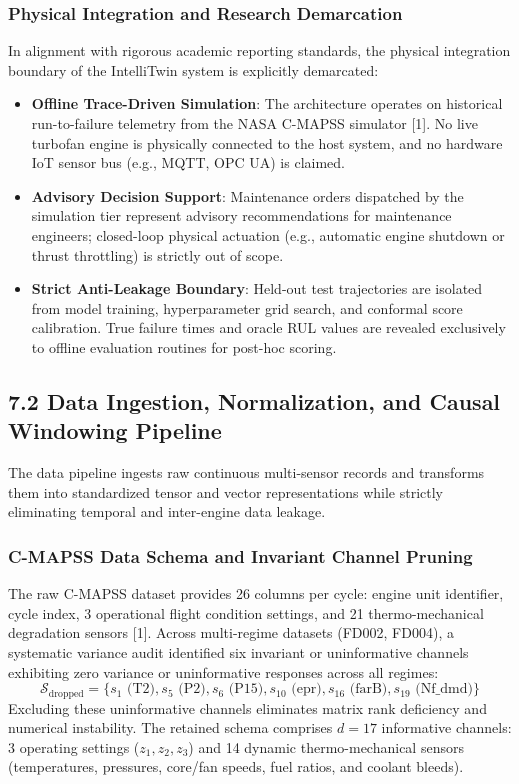 \documentclass[12pt,a4paper]{article}
\begin{document}
\subsubsection*{Physical Integration and Research Demarcation}
In alignment with rigorous academic reporting standards, the physical integration boundary of the IntelliTwin system is explicitly demarcated:
\begin{itemize}
    \item \textbf{Offline Trace-Driven Simulation}: The architecture operates on historical run-to-failure telemetry from the NASA C-MAPSS simulator [1]. No live turbofan engine is physically connected to the host system, and no hardware IoT sensor bus (e.g., MQTT, OPC UA) is claimed.
    \item \textbf{Advisory Decision Support}: Maintenance orders dispatched by the simulation tier represent advisory recommendations for maintenance engineers; closed-loop physical actuation (e.g., automatic engine shutdown or thrust throttling) is strictly out of scope.
    \item \textbf{Strict Anti-Leakage Boundary}: Held-out test trajectories are isolated from model training, hyperparameter grid search, and conformal score calibration. True failure times and oracle RUL values are revealed exclusively to offline evaluation routines for post-hoc scoring.
\end{itemize}

\subsection*{7.2 Data Ingestion, Normalization, and Causal Windowing Pipeline}
The data pipeline ingests raw continuous multi-sensor records and transforms them into standardized tensor and vector representations while strictly eliminating temporal and inter-engine data leakage.

\subsubsection*{C-MAPSS Data Schema and Invariant Channel Pruning}
The raw C-MAPSS dataset provides 26 columns per cycle: engine unit identifier, cycle index, 3 operational flight condition settings, and 21 thermo-mechanical degradation sensors [1]. Across multi-regime datasets (FD002, FD004), a systematic variance audit identified six invariant or uninformative channels exhibiting zero variance or uninformative responses across all regimes:
\begin{equation}
\mathcal{S}_{\text{dropped}} = \{ s_1 \text{ (T2)}, s_5 \text{ (P2)}, s_6 \text{ (P15)}, s_{10} \text{ (epr)}, s_{16} \text{ (farB)}, s_{19} \text{ (Nf\_dmd)} \}
\end{equation}
Excluding these uninformative channels eliminates matrix rank deficiency and numerical instability. The retained schema comprises $d = 17$ informative channels: 3 operating settings ($z_1, z_2, z_3$) and 14 dynamic thermo-mechanical sensors (temperatures, pressures, core/fan speeds, fuel ratios, and coolant bleeds).
\end{document}
